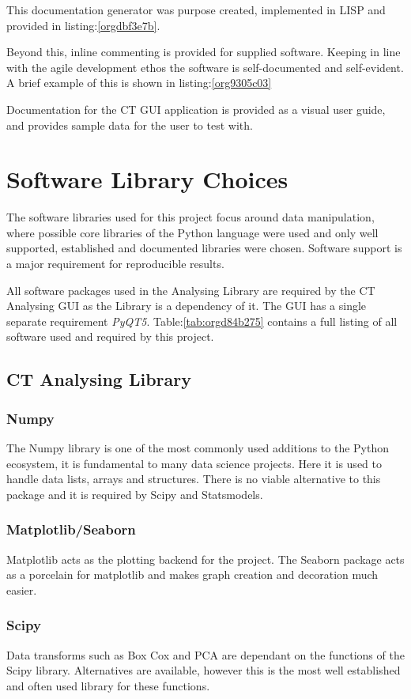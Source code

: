 \documentclass[11pt]{report}
\begin{document}
This documentation generator was purpose created, implemented in LISP and provided in listing:\ref{orgdbf3e7b}.

Beyond this, inline commenting is provided for supplied software. Keeping in line with the agile development ethos the software is self-documented and self-evident. A brief example of this is shown in listing:\ref{org9305c03}

Documentation for the CT GUI application is provided as a visual user guide, and provides sample data for the user to test with.
\section{Software Library Choices}
\label{sec:orgc2e311b}
The software libraries used for this project focus around data manipulation, where possible core libraries of the Python language were used and only well supported, established and documented libraries were chosen. Software support is a major requirement for reproducible results.

All software packages used in the Analysing Library are required by the CT Analysing GUI as the Library is a dependency of it. The GUI has a single separate requirement \emph{PyQT5}.
Table:\ref{tab:orgd84b275} contains a full listing of all software used and required by this project.
\subsection{CT Analysing Library}
\label{sec:orgb8ae430}
\subsubsection{Numpy}
\label{sec:org40fd166}
The Numpy library is one of the most commonly used additions to the Python ecosystem, it is fundamental to many data science projects. Here it is used to handle data lists, arrays and structures. There is no viable alternative to this package and it is required by Scipy and Statsmodels.
\subsubsection{Matplotlib/Seaborn}
\label{sec:orgc9ab95b}
Matplotlib acts as the plotting backend for the project. The Seaborn package acts as a porcelain for matplotlib and makes graph creation and decoration much easier.
\subsubsection{Scipy}
\label{sec:orgf78f6d6}
Data transforms such as Box Cox and PCA are dependant on the functions of the Scipy library. Alternatives are available, however this is the most well established and often used library for these functions.
\end{document}
